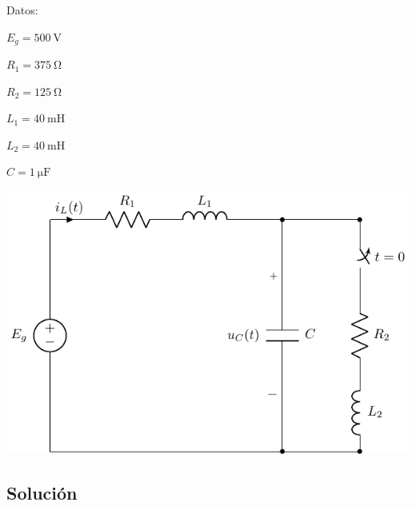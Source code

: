 \documentclass[12pt]{article}
\begin{document}
\begin{multicols}{3}

Datos:

$E_g = \SI{500}{\volt}$

$R_{1}= \SI{375}{\ohm}$%

$R_{2}=\SI{125}{\ohm}$%

$L_1 = \SI{40}{\milli\henry}$%

$L_2 = \SI{40}{\milli\henry}$%

$C = \SI{1}{\micro\farad}$%

\columnbreak

  \includegraphics{figs/E1_RLC.pdf}

\end{multicols}

\clearpage

\subsection*{Solución}
\end{document}
